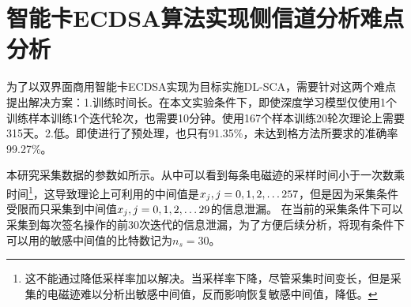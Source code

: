 {	%
	
	
	
	\section{智能卡ECDSA算法实现侧信道分析难点分析}\label{sec:hardpoint}
	为了以双界面商用智能卡ECDSA实现为目标实施DL-SCA，需要针对这两个难点提出解决方案：1.训练时间长。在本文实验条件下，即使深度学习模型仅使用1个训练样本训练1个迭代轮次，也需要10分钟。使用167个样本训练20轮次理论上需要315天。2.\zyx 低。即使进行了预处理，\zyx 也只有91.35\%，未达到格方法所要求的准确率99.27\%。
	
	本研究采集数据的参数如所示。从中可以看到每条电磁迹的采样时间小于一次数乘时间\footnote{这不能通过降低采样率加以解决。当采样率下降，尽管采集时间变长，但是采集的电磁迹难以分析出敏感中间值，反而影响恢复敏感中间值，降低\zyx 。}，这导致理论上可利用的中间值是$x_j,j=0,1,2,\dots257$，但是因为采集条件受限而只采集到中间值$x_j,j=0,1,2,\dots 29$的信息泄漏。%
	在当前的采集条件下可以采集到每次签名操作的前30次迭代的信息泄漏，为了方便后续分析，将现有条件下可以用的敏感中间值的比特数记为$n_s=30$。
	
}
